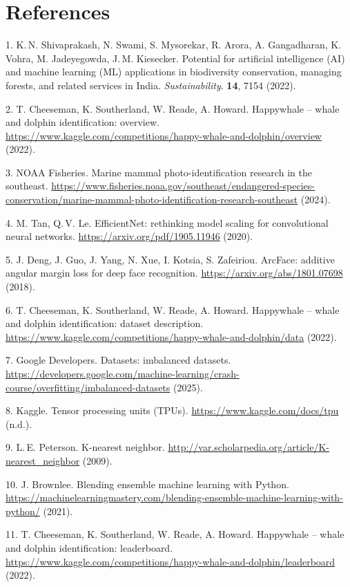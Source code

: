 \documentclass[twocolumn]{article}
\begin{document}
\section{References}

1. K.\,N. Shivaprakash, N. Swami, S. Mysorekar, R. Arora, A. Gangadharan, K. Vohra, M. Jadeyegowda, J.\,M. Kiesecker. Potential for artificial intelligence (AI) and machine learning (ML) applications in biodiversity conservation, managing forests, and related services in India. \textit{Sustainability}. \textbf{14}, 7154 (2022).

2. T. Cheeseman, K. Southerland, W. Reade, A. Howard. Happywhale – whale and dolphin identification: overview. \url{https://www.kaggle.com/competitions/happy-whale-and-dolphin/overview} (2022).

3. NOAA Fisheries. Marine mammal photo-identification research in the southeast. \url{https://www.fisheries.noaa.gov/southeast/endangered-species-conservation/marine-mammal-photo-identification-research-southeast} (2024).

4. M. Tan, Q.\,V. Le. EfficientNet: rethinking model scaling for convolutional neural networks. \url{https://arxiv.org/pdf/1905.11946} (2020).

5. J. Deng, J. Guo, J. Yang, N. Xue, I. Kotsia, S. Zafeiriou. ArcFace: additive angular margin loss for deep face recognition. \url{https://arxiv.org/abs/1801.07698} (2018).

6. T. Cheeseman, K. Southerland, W. Reade, A. Howard. Happywhale – whale and dolphin identification: dataset description. \url{https://www.kaggle.com/competitions/happy-whale-and-dolphin/data} (2022).

7. Google Developers. Datasets: imbalanced datasets. \url{https://developers.google.com/machine-learning/crash-course/overfitting/imbalanced-datasets} (2025).

8. Kaggle. Tensor processing units (TPUs). \url{https://www.kaggle.com/docs/tpu} (n.d.).

9. L.\,E. Peterson. K-nearest neighbor. \url{http://var.scholarpedia.org/article/K-nearest_neighbor} (2009).

10. J. Brownlee. Blending ensemble machine learning with Python. \url{https://machinelearningmastery.com/blending-ensemble-machine-learning-with-python/} (2021).

11. T. Cheeseman, K. Southerland, W. Reade, A. Howard. Happywhale – whale and dolphin identification: leaderboard. \url{https://www.kaggle.com/competitions/happy-whale-and-dolphin/leaderboard} (2022).
\end{document}
